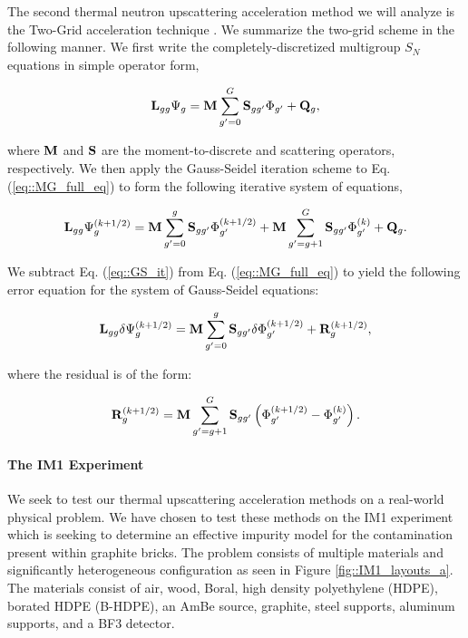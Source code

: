 \documentclass[11pt]{article}
\begin{document}
The second thermal neutron upscattering acceleration method we will analyze is the Two-Grid acceleration technique \cite{adams1993two}. We summarize the two-grid scheme in the following manner. We first write the completely-discretized multigroup $S_N$ equations in simple operator form,

\begin{equation}
\label{eq::MG_full_eq}
{\bf L}_{gg} \Psi_g =  {\bf M} \sum_{g'=0}^G {\bf S}_{g g'} \Phi_{g'} + {\bf Q}_g,
\end{equation}

\noindent where ${\bf M}$ and ${\bf S}$ are the moment-to-discrete and scattering operators, respectively. We then apply the Gauss-Seidel iteration scheme to Eq. (\ref{eq::MG_full_eq}) to form the following iterative system of equations,

\begin{equation}
\label{eq::GS_it}
{\bf L}_{gg} \Psi_g^{(k+1/2)} = {\bf M} \sum_{g'=0}^g {\bf S}_{g g'} \Phi_{g'}^{(k+1/2)} + {\bf M} \sum_{g'=g+1}^G {\bf S}_{g g'} \Phi_{g'}^{(k)} + {\bf Q}_g .
\end{equation}

We subtract Eq. (\ref{eq::GS_it}) from Eq. (\ref{eq::MG_full_eq}) to yield the following error equation for the system of Gauss-Seidel equations:

\begin{equation}
\label{eq::GS_error}
{\bf L}_{gg} \delta \Psi_g^{(k+1/2)} = {\bf M} \sum_{g'=0}^g {\bf S}_{g g'} \delta \Phi_{g'}^{(k+1/2)} + {\bf R}_g^{(k+1/2)}  ,
\end{equation}

\noindent where the residual is of the form:

\begin{equation}
\label{eq::TG_residual}
{\bf R}_g^{(k+1/2)} = {\bf M} \sum_{g'=g+1}^G {\bf S}_{g g'} \left(  \Phi_{g'}^{(k+1/2)} - \Phi_{g'}^{(k)}  \right).
\end{equation}

\paragraph{The IM1 Experiment}
\label{sec::CW_DSA_Upscatter_IM1}

We seek to test our thermal upscattering acceleration methods on a real-world physical problem. We have chosen to test these methods on the IM1 experiment which is seeking to determine an effective impurity model for the contamination present within graphite bricks. The problem consists of multiple materials and significantly heterogeneous configuration as seen in Figure \ref{fig::IM1_layouts_a}. The materials consist of air, wood, Boral, high density polyethylene (HDPE), borated HDPE (B-HDPE), an AmBe source, graphite, steel supports, aluminum supports, and a BF3 detector. 
\end{document}
